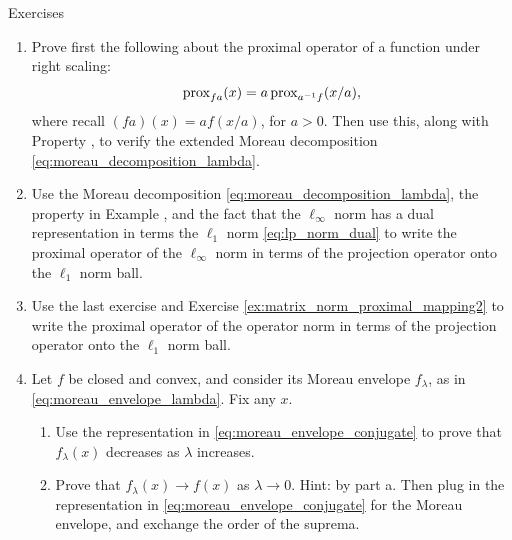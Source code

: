 \begin{xcb}{Exercises}
\begin{enumerate}[label=\thechapter.\arabic*]
\smallskip 
{}
Note: this fact---that for convex and differentiable $f$, co-coercivity of the 
gradient \eqref{eq:gradient_co_coercivity} is equivalent to Lipschitzness of
$\nabla f$---is called the \emph{Baillon-Haddad theorem}, due to
\cite{baillon1977quelques}. 

\item \label{ex:moreau_decomposition_lambda}
  Prove first the following about the proximal operator of a function under
  right scaling: 
  \[
  \operatorname{prox}_{fa}(x) = a \operatorname{prox}_{a^{-1} f} (x/a), 
  \] 
  where recall $(fa)(x) = a f(x/a)$, for $a>0$. Then use this, along with
  Property , to verify the extended Moreau
  decomposition \eqref{eq:moreau_decomposition_lambda}.  

\item \label{ex:linf_norm_proximal_mapping}
  Use the Moreau decomposition \eqref{eq:moreau_decomposition_lambda}, the 
  property in Example , and the fact that the
  $\ell_\infty$ norm has a dual representation in terms the $\ell_1$ norm
  \eqref{eq:lp_norm_dual} to write the proximal operator of the $\ell_\infty$
  norm in terms of the projection operator onto the $\ell_1$ norm ball. 

\item \label{ex:operator_norm_proximal_mapping} 
  Use the last exercise and Exercise \ref{ex:matrix_norm_proximal_mapping2} to
  write the proximal operator of the operator norm in terms of the projection
  operator onto the $\ell_1$ norm ball.   

\item \label{ex:moreau_envelope_conjugate}
  Let $f$ be closed and convex, and consider its Moreau envelope $f_\lambda$, as
  in \eqref{eq:moreau_envelope_lambda}. Fix any $x$.

\begin{enumerate}[label=\alph*.]
\item Use the representation in \eqref{eq:moreau_envelope_conjugate} to prove
  that $f_\lambda(x)$ decreases as $\lambda$ increases.   

\item Prove that $f_\lambda(x) \to f(x)$ as $\lambda \to 0$. Hint:
   by part a. Then plug in the representation in 
  \eqref{eq:moreau_envelope_conjugate} for the Moreau envelope, and exchange the  
  order of the suprema.   
\end{enumerate}


\end{enumerate}
\end{xcb}
